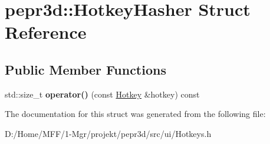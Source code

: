 \hypertarget{structpepr3d_1_1_hotkey_hasher}{}\section{pepr3d\+::Hotkey\+Hasher Struct Reference}
\label{structpepr3d_1_1_hotkey_hasher}
\subsection*{Public Member Functions}
\begin{DoxyCompactItemize}
\item 
\mbox{\label{structpepr3d_1_1_hotkey_hasher_a009c1c39bddad8bd3379b793411e1145}} 
std\+::size\+\_\+t {\bfseries operator()} (const \mbox{\hyperlink{structpepr3d_1_1_hotkey}{Hotkey}} \&hotkey) const
\end{DoxyCompactItemize}


The documentation for this struct was generated from the following file\+:\begin{DoxyCompactItemize}
\item 
D\+:/\+Home/\+M\+F\+F/1-\/\+Mgr/projekt/pepr3d/src/ui/Hotkeys.\+h\end{DoxyCompactItemize}
